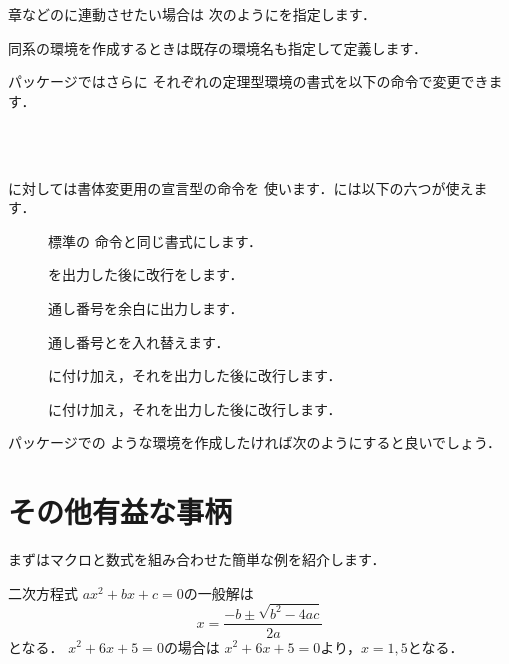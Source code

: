 %
章などのに連動させたい場合は
次のようにを指定します．
\begin{Syntax}
\end{Syntax}

同系の環境を作成するときは既存の環境名も指定して定義します．
\begin{Syntax}
\end{Syntax}

パッケージではさらに
それぞれの定理型環境の書式を以下の命令で変更できます．
\begin{Syntax}
\\
\\
\end{Syntax}

に対しては書体変更用の宣言型の命令を
使います．には以下の六つが使えます．
\begin{description}
\item[] 
   標準の 命令と同じ書式にします．
\item[] 
   を出力した後に改行をします．
\item[] 
   通し番号を余白に出力します．
\item[]
   通し番号とを入れ替えます．
\item[] 
  に付け加え，それを出力した後に改行します．
\item[]
  に付け加え，それを出力した後に改行します．
\end{description}
パッケージでの
ような環境を作成したければ次のようにすると良いでしょう．

\begin{InTeX}
{\theorembodyfont{\normalfont}
\theoremheaderfont{\normalfont\bfseries}
\newtheorem{Exam}{例題}
\newtheorem{Refer}[Exam]{参考}
\newtheorem{Prob}[Exam]{問題}}
\end{InTeX}



\section{その他有益な事柄}

まずはマクロと数式を組み合わせた簡単な例を紹介します．
\begin{InOut}
\newcommand*\niji[3][]{%
  \ensuremath{#1x^2+#2x+#3=0}}
\newcommand*\Niji[3][]{%
  \ensuremath{x=\frac{-#2\pm%
  \sqrt{#2^2-4#1#3}}{2#1}}}
二次方程式\niji[a]{b}{c}の一般解は
\begin{displaymath}
\Niji[a]{b}{c}
\end{displaymath}
となる．\niji{6}{5}の場合は
 \niji{6}{5}より，$x=1,5$となる．
\end{InOut}

